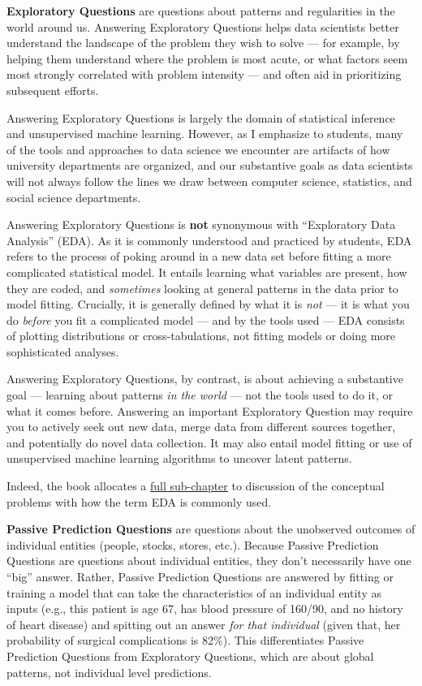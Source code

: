\documentclass[12pt]{article}
\begin{document}
\textbf{Exploratory Questions} are questions about patterns and
regularities in the world around us. Answering Exploratory Questions
helps data scientists better understand the landscape of the problem
they wish to solve --- for example, by helping them understand where the
problem is most acute, or what factors seem most strongly correlated
with problem intensity --- and often aid in prioritizing subsequent
efforts.

Answering Exploratory Questions is largely the domain of statistical
inference and unsupervised machine learning. However, as I emphasize to
students, many of the tools and approaches to data science we encounter
are artifacts of how university departments are organized, and our
substantive goals as data scientists will not always follow the lines we
draw between computer science, statistics, and social science
departments.

Answering Exploratory Questions is \textbf{not} synonymous with
``Exploratory Data Analysis'' (EDA). As it is commonly understood and
practiced by students, EDA refers to the process of poking around in a
new data set before fitting a more complicated statistical model. It
entails learning what variables are present, how they are coded, and
\emph{sometimes} looking at general patterns in the data prior to model
fitting. Crucially, it is generally defined by what it is \emph{not} ---
it is what you do \emph{before} you fit a complicated model --- and by
the tools used --- EDA consists of plotting distributions or
cross-tabulations, not fitting models or doing more sophisticated
analyses.

Answering Exploratory Questions, by contrast, is about achieving a
substantive goal --- learning about patterns \emph{in the world} --- not
the tools used to do it, or what it comes before. Answering an important
Exploratory Question may require you to actively seek out new data,
merge data from different sources together, and potentially do novel
data collection. It may also entail model fitting or use of unsupervised
machine learning algorithms to uncover latent patterns.

Indeed, the book allocates a
\href{https://ds4humans.com/30_questions/07_eda.html}{full sub-chapter}
to discussion of the conceptual problems with how the term EDA is
commonly used.

\textbf{Passive Prediction Questions} are questions about the unobserved
outcomes of individual entities (people, stocks, stores, etc.). Because
Passive Prediction Questions are questions about individual entities,
they don't necessarily have one ``big'' answer. Rather, Passive
Prediction Questions are answered by fitting or training a model that
can take the characteristics of an individual entity as inputs (e.g.,
this patient is age 67, has blood pressure of 160/90, and no history of
heart disease) and spitting out an answer \emph{for that individual}
(given that, her probability of surgical complications is 82\%). This
differentiates Passive Prediction Questions from Exploratory Questions,
which are about global patterns, not individual level predictions.
\end{document}
